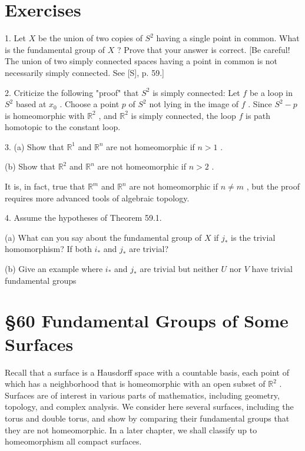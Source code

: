 \documentclass[10pt]{article}
\begin{document}
\section*{Exercises}

1. Let \(X\) be the union of two copies of \({S}^{2}\) having a single point in common. What is the fundamental group of \(X\) ? Prove that your answer is correct. [Be careful! The union of two simply connected spaces having a point in common is not necessarily simply connected. See [S], p. 59.]

2. Criticize the following "proof" that \({S}^{2}\) is simply connected: Let \(f\) be a loop in \({S}^{2}\) based at \({x}_{0}\) . Choose a point \(p\) of \({S}^{2}\) not lying in the image of \(f\) . Since \({S}^{2} - p\) is homeomorphic with \({\mathbb{R}}^{2}\) , and \({\mathbb{R}}^{2}\) is simply connected, the loop \(f\) is path homotopic to the constant loop.

3. (a) Show that \({\mathbb{R}}^{1}\) and \({\mathbb{R}}^{n}\) are not homeomorphic if \(n > 1\) .

(b) Show that \({\mathbb{R}}^{2}\) and \({\mathbb{R}}^{n}\) are not homeomorphic if \(n > 2\) .

It is, in fact, true that \({\mathbb{R}}^{m}\) and \({\mathbb{R}}^{n}\) are not homeomorphic if \(n \neq  m\) , but the proof requires more advanced tools of algebraic topology.

4. Assume the hypotheses of Theorem 59.1.

(a) What can you say about the fundamental group of \(X\) if \({j}_{ * }\) is the trivial homomorphism? If both \({i}_{ * }\) and \({j}_{ * }\) are trivial?

(b) Give an example where \({i}_{ * }\) and \({j}_{ * }\) are trivial but neither \(U\) nor \(V\) have trivial fundamental groups

\section*{§60 Fundamental Groups of Some Surfaces}

Recall that a surface is a Hausdorff space with a countable basis, each point of which has a neighborhood that is homeomorphic with an open subset of \({\mathbb{R}}^{2}\) . Surfaces are of interest in various parts of mathematics, including geometry, topology, and complex analysis. We consider here several surfaces, including the torus and double torus, and show by comparing their fundamental groups that they are not homeomorphic. In a later chapter, we shall classify up to homeomorphism all compact surfaces.
\end{document}
